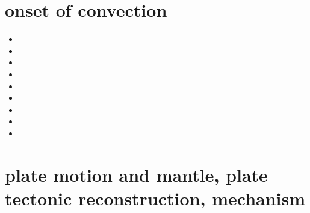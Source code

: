 \section{onset of convection}

\begin{small}
\begin{itemize}
\item[\nineteensixtynine]
\item[\nineteeneightytwo] 
\item[\nineteenninety] 
\item[\twothousand] 
\item[\twothousandsix] 
\item[\twothousandtwo] 
\item[\twothousandtwo] 
\item[\twothousandseven] 
\item[\twothousandfifteen] 
\end{itemize}
\end{small}

\section{plate motion and mantle, plate tectonic reconstruction, mechanism}

